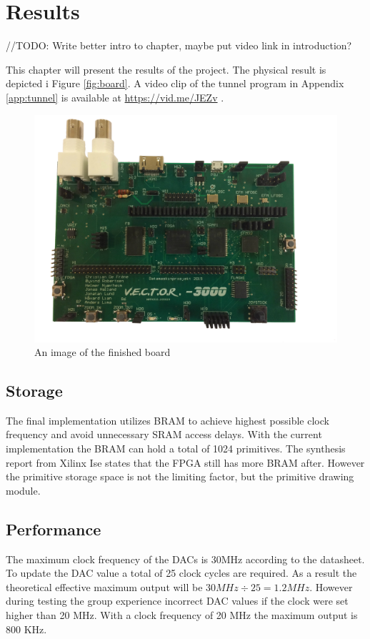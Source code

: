 \chapter{Results}
//TODO: Write better intro to chapter, maybe put video link in introduction?

This chapter will present the results of the project. The physical result is depicted i Figure \ref{fig:board}.
A video clip of the tunnel program in Appendix \ref{app:tunnel} is available at \href{https://vid.me/JEZv}{https://vid.me/JEZv} \cite{tunnel-demo}.

\begin{figure}[h!]
	    \includegraphics[width=\linewidth]{images/board_top.jpg}
	    \caption{An image of the finished \vthreek board}
	    \label{fig:board-top}
\end{figure}

\section{Storage}
The final implementation utilizes BRAM to achieve highest possible clock frequency and avoid unnecessary SRAM access delays.
With the current implementation the BRAM can hold a total of 1024 primitives.
The synthesis report from Xilinx Ise states that the FPGA still has more BRAM after.
However the primitive storage space is not the limiting factor, but the primitive drawing module.

\section{Performance}
The maximum clock frequency of the DACs is 30MHz according to the datasheet.
To update the DAC value a total of 25 clock cycles are required.
As a result the theoretical effective maximum output will be \(30 MHz \div 25 = 1.2 MHz \).
However during testing the group experience incorrect DAC values if the clock were set higher than 20 MHz.
With a clock frequency of 20 MHz the maximum output is 800 KHz.


